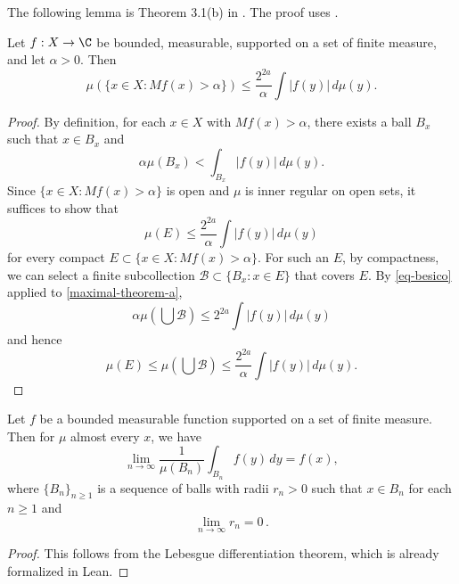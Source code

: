 The following lemma is Theorem 3.1(b) in \cite{stein-book}. The proof uses .
\begin{lemma}
    \label{maximal-theorem}
    \leanok
    Let $f: X \to \C$ be bounded, measurable, supported on a set of finite measure, and let $\alpha > 0$. Then
    \begin{equation}
        \label{maximal-theorem-equation}
        \mu(\{x\in X : Mf(x) > \alpha\}) \le \frac{2^{2a}}{\alpha} \int |f(y)|\, d\mu(y).
    \end{equation}
\end{lemma}
\begin{proof}
    \leanok
    By definition, for each $x\in X$ with $Mf(x) > \alpha$, there exists a ball $B_x$ such that $x\in B_x$ and
    \begin{equation}
        \label{maximal-theorem-a}
        \alpha \mu(B_x) < \int_{B_x} |f(y)|\, d\mu(y).
    \end{equation}
    Since $\{x\in X : Mf(x) > \alpha\}$ is open and $\mu$ is inner regular on open sets, it suffices to show that
    \begin{equation*}
        \mu(E) \le \frac{2^{2a}}{\alpha} \int |f(y)|\, d\mu(y)
    \end{equation*}
    for every compact $E\subset \{x\in X : Mf(x) > \alpha\}$.
    For such an $E$, by compactness, we can select a finite subcollection $\mathcal{B} \subset \{B_x: x\in E\}$ that covers $E$.
    By \eqref{eq-besico} applied to \eqref{maximal-theorem-a},
    \begin{equation}
        \alpha \mu(\bigcup \mathcal{B}) \le 2^{2a} \int |f(y)|\,d\mu(y)
    \end{equation}
    and hence
    \begin{equation*}
        \mu(E) \le \mu(\bigcup \mathcal{B}) \le \frac{2^{2a}}{\alpha} \int |f(y)|\,d\mu(y).
    \end{equation*}
\end{proof}

\begin{lemma}
    \label{Lebesgue-differentiation}
    \leanok
    Let $f$ be a bounded measurable function supported on a set of finite measure. Then for $\mu$ almost every $x$, we have
    $$\lim_{n\to \infty} \frac{1}{\mu(B_n)}\int_{B_n} f(y)\, dy= f(x),$$
    where $\{B_n\}_{n\geq 1}$ is a sequence of balls with radii $r_n>0$ such that $x\in B_n$ for each $n\geq 1$ and
    \begin{equation*}
        \lim_{n\to \infty} r_n=0 \,.
    \end{equation*}
\end{lemma}
\begin{proof}
    \leanok
    This follows from the Lebesgue differentiation theorem, which is already formalized in Lean.
\end{proof}

